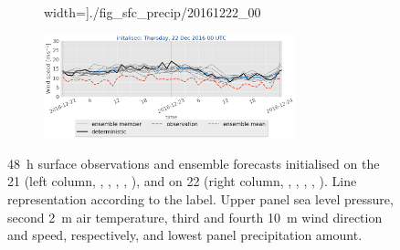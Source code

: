 \begin{figure}[H]
\begin{subfigure}[b]{0.49\textwidth}
		width=\textwidth]{./fig_sfc_precip/20161222_00}
		\caption{}\label{fig:res:sfc_precip22}
	\end{subfigure}
	
	\begin{subfigure}[b]{\textwidth}
		\centering
		\includegraphics[trim={5.5cm 0cm 5.cm 17.2cm},clip,
		width=0.8\textwidth]{./fig_sfc_ws/20161222_00}
	\end{subfigure}
	\caption{\SI{48}{\hour} surface observations and ensemble forecasts initialised on the \SI{21}{\dec} (left column, \protect{}, \protect{}, \protect{}, \protect{}, \protect{}), and on \SI{22}{\dec} (right column, \protect{}, \protect{}, \protect{}, \protect{}, \protect{}). Line representation according to the label. Upper panel sea level pressure, second \SI{2}{\metre} air temperature, third and fourth \SI{10}{\metre} wind direction and speed, respectively, and lowest panel precipitation amount. }\label{fig:app:sfc_obs_meps}
\end{figure}
